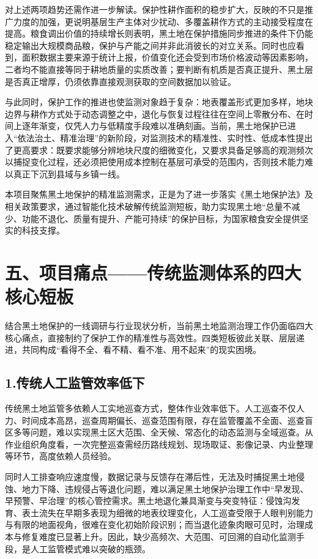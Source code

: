\documentclass[12pt, a4paper]{ctexart}
\begin{document}
对上述两项趋势还需作进一步解读。保护性耕作面积的稳步扩大，反映的不只是推广力度的加强，更说明基层生产主体对少扰动、多覆盖耕作方式的主动接受程度在提高。粮食调出价值的持续增长则表明，黑土地在保护措施同步推进的条件下仍能稳定输出大规模商品粮，保护与产能之间并非此消彼长的对立关系。同时也应看到，面积数据主要来源于统计上报，价值变化还会受到市场价格波动等因素影响，二者均不能直接等同于耕地质量的实质改善；要判断有机质是否真正提升、黑土层是否真正增厚，仍须依靠直接观测获取的空间数据加以验证。

与此同时，保护工作的推进也使监测对象趋于复杂：地表覆盖形式更加多样，地块边界与耕作方式处于动态调整之中，退化与恢复过程往往在空间上零散分布、在时间上逐年渐变，仅凭人力与低精度手段难以准确刻画。当前，黑土地保护已进入“依法治土、精准治理”的新阶段，对监测技术的精准性、实时性、低成本性提出了更高要求：既要求能够分辨地块尺度的细微变化，又要求具备足够高的观测频次以捕捉变化过程，还必须把使用成本控制在基层可承受的范围内，否则技术能力难以真正下沉到县域与乡镇一线。

本项目聚焦黑土地保护的精准监测需求，正是为了进一步落实《黑土地保护法》及相关政策要求，通过智能化技术破解传统监测短板，助力实现黑土地“总量不减少、功能不退化、质量有提升、产能可持续”的保护目标，为国家粮食安全提供坚实的科技支撑。

\section{五、项目痛点——传统监测体系的四大核心短板}

结合黑土地保护的一线调研与行业现状分析，当前黑土地监测治理工作仍面临四大核心痛点，直接制约了保护工作的精准性与高效性。四类短板彼此关联、层层递进，共同构成“看得不全、看不精、看不准、用不起来”的现实困境。

\subsection{1.传统人工监管效率低下}

传统黑土地监管多依赖人工实地巡查方式，整体作业效率低下。人工巡查不仅人力、时间成本高昂，巡查周期偏长、巡查范围有限，存在监管覆盖不全面、巡查盲区多等问题，难以实现黑土区大范围、全天候、常态化的动态监测与全域巡查。从作业组织角度看，一次完整巡查需经历路线规划、现场取证、影像记录、内业整理等环节，高度依赖人员经验。

同时人工排查响应速度慢，数据记录与反馈存在滞后性，无法及时捕捉黑土地侵蚀、地力下降、违规侵占等退化问题，难以满足黑土地保护治理工作中“早发现、早预警、早治理”的核心管控需求。黑土地退化兼具渐变与突变特征：侵蚀沟发育、表土流失在早期多表现为细微的地表纹理变化，人工巡查受限于人眼判别能力与有限的地面视角，很难在变化初始阶段识别；而当退化迹象肉眼可见时，治理成本与修复难度已显著上升。因此，缺少高频次、大范围、可回溯的自动化监测手段，是人工监管模式难以突破的瓶颈。
\end{document}
